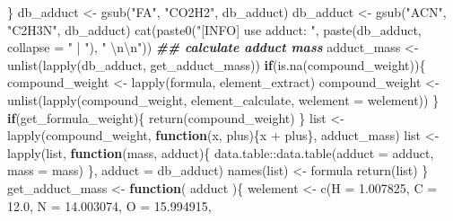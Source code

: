 \documentclass[
]{article}
\newenvironment{Shaded}{\begin{snugshade}}{\end{snugshade}}
\newcommand{\AttributeTok}[1]{\textcolor[rgb]{0.77,0.63,0.00}{#1}}
\newcommand{\ControlFlowTok}[1]{\textcolor[rgb]{0.13,0.29,0.53}{\textbf{#1}}}
\newcommand{\DocumentationTok}[1]{\textcolor[rgb]{0.56,0.35,0.01}{\textbf{\textit{#1}}}}
\newcommand{\FloatTok}[1]{\textcolor[rgb]{0.00,0.00,0.81}{#1}}
\newcommand{\FunctionTok}[1]{\textcolor[rgb]{0.00,0.00,0.00}{#1}}
\newcommand{\NormalTok}[1]{#1}
\newcommand{\OtherTok}[1]{\textcolor[rgb]{0.56,0.35,0.01}{#1}}
\newcommand{\SpecialCharTok}[1]{\textcolor[rgb]{0.00,0.00,0.00}{#1}}
\newcommand{\StringTok}[1]{\textcolor[rgb]{0.31,0.60,0.02}{#1}}
\begin{document}
\begin{Shaded}
\begin{Highlighting}[]
\NormalTok{    \}}
\NormalTok{    db\_adduct }\OtherTok{\textless{}{-}} \FunctionTok{gsub}\NormalTok{(}\StringTok{"FA"}\NormalTok{, }\StringTok{"CO2H2"}\NormalTok{, db\_adduct)}
\NormalTok{    db\_adduct }\OtherTok{\textless{}{-}} \FunctionTok{gsub}\NormalTok{(}\StringTok{"ACN"}\NormalTok{, }\StringTok{"C2H3N"}\NormalTok{, db\_adduct)}
    \FunctionTok{cat}\NormalTok{(}\FunctionTok{paste0}\NormalTok{(}\StringTok{"[INFO] use adduct: "}\NormalTok{, }\FunctionTok{paste}\NormalTok{(db\_adduct, }\AttributeTok{collapse =} \StringTok{" | "}\NormalTok{), }\StringTok{" }\SpecialCharTok{\textbackslash{}n\textbackslash{}n}\StringTok{"}\NormalTok{))}
    \DocumentationTok{\#\# calculate adduct mass}
\NormalTok{    adduct\_mass }\OtherTok{\textless{}{-}} \FunctionTok{unlist}\NormalTok{(}\FunctionTok{lapply}\NormalTok{(db\_adduct, get\_adduct\_mass))}
    \ControlFlowTok{if}\NormalTok{(}\FunctionTok{is.na}\NormalTok{(compound\_weight))\{}
\NormalTok{      compound\_weight }\OtherTok{\textless{}{-}} \FunctionTok{lapply}\NormalTok{(formula, element\_extract)}
\NormalTok{      compound\_weight }\OtherTok{\textless{}{-}} \FunctionTok{unlist}\NormalTok{(}\FunctionTok{lapply}\NormalTok{(compound\_weight, element\_calculate, }\AttributeTok{welement =}\NormalTok{ welement))}
\NormalTok{    \}}
    \ControlFlowTok{if}\NormalTok{(get\_formula\_weight)\{}
      \FunctionTok{return}\NormalTok{(compound\_weight)}
\NormalTok{    \}}
\NormalTok{    list }\OtherTok{\textless{}{-}} \FunctionTok{lapply}\NormalTok{(compound\_weight, }\ControlFlowTok{function}\NormalTok{(x, plus)\{x }\SpecialCharTok{+}\NormalTok{ plus\}, adduct\_mass)}
\NormalTok{    list }\OtherTok{\textless{}{-}} \FunctionTok{lapply}\NormalTok{(list,}
      \ControlFlowTok{function}\NormalTok{(mass, adduct)\{}
\NormalTok{        data.table}\SpecialCharTok{::}\FunctionTok{data.table}\NormalTok{(}\AttributeTok{adduct =}\NormalTok{ adduct, }\AttributeTok{mass =}\NormalTok{ mass)}
\NormalTok{      \}, }\AttributeTok{adduct =}\NormalTok{ db\_adduct)}
    \FunctionTok{names}\NormalTok{(list) }\OtherTok{\textless{}{-}}\NormalTok{ formula}
    \FunctionTok{return}\NormalTok{(list)}
\NormalTok{  \}}
\NormalTok{get\_adduct\_mass }\OtherTok{\textless{}{-}} 
  \ControlFlowTok{function}\NormalTok{(}
\NormalTok{    adduct}
\NormalTok{    )\{}
\NormalTok{    welement }\OtherTok{\textless{}{-}} \FunctionTok{c}\NormalTok{(}\AttributeTok{H =} \FloatTok{1.007825}\NormalTok{,}
      \AttributeTok{C =} \FloatTok{12.0}\NormalTok{,}
      \AttributeTok{N =} \FloatTok{14.003074}\NormalTok{,}
      \AttributeTok{O =} \FloatTok{15.994915}\NormalTok{,}

\end{Highlighting}
\end{Shaded}
\end{document}
